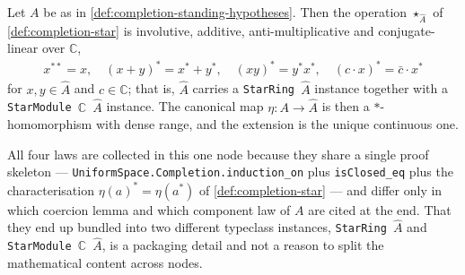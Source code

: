 \begin{lemma}
    \label{lmm:star-extends-to-completion}
    \leanok
    Let $A$ be as in \ref{def:completion-standing-hypotheses}. Then the operation $\star_{\widehat{A}}$ of \ref{def:completion-star} is involutive, additive, anti-multiplicative and conjugate-linear over $\mathbb{C}$,
    \begin{align}
        x^{**} = x, \quad (x+y)^{*} = x^{*} + y^{*}, \quad (xy)^{*} = y^{*}x^{*}, \quad (c \cdot x)^{*} = \bar{c} \cdot x^{*}
    \end{align}
    for $x, y \in \widehat{A}$ and $c \in \mathbb{C}$; that is, $\widehat{A}$ carries a \texttt{StarRing \ensuremath{\widehat{A}}} instance together with a \texttt{StarModule \ensuremath{\mathbb{C}} \ensuremath{\widehat{A}}} instance. The canonical map $\eta : A \to \widehat{A}$ is then a $*$-homomorphism with dense range, and the extension is the unique continuous one.

    All four laws are collected in this one node because they share a single proof skeleton --- \texttt{UniformSpace.Completion.induction\_on} plus \texttt{isClosed\_eq} plus the characterisation $\eta(a)^{*} = \eta(a^{*})$ of \ref{def:completion-star} --- and differ only in which coercion lemma and which component law of $A$ are cited at the end. That they end up bundled into two different typeclass instances, \texttt{StarRing \ensuremath{\widehat{A}}} and \texttt{StarModule \ensuremath{\mathbb{C}} \ensuremath{\widehat{A}}}, is a packaging detail and not a reason to split the mathematical content across nodes.
\end{lemma}
